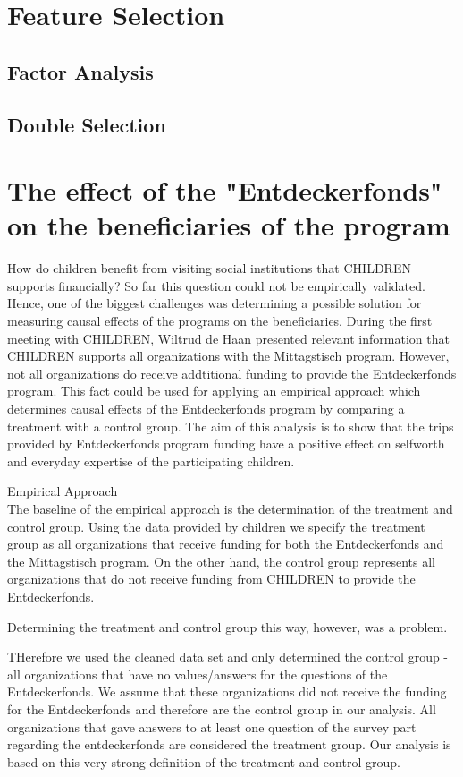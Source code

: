 \documentclass[12pt, a4paper, titlepage]{article}\usepackage[]{graphicx}\usepackage[]{color}
\begin{document}
\section{Feature Selection}

\subsection{Factor Analysis}

\subsection{Double Selection}

\section{The effect of the "Entdeckerfonds" on the beneficiaries of the program}

How do children benefit from visiting social institutions that CHILDREN supports financially? So far this question could not be empirically validated. Hence, one of the biggest challenges was determining a possible solution for measuring causal effects of the programs on the beneficiaries. During the first meeting with CHILDREN, Wiltrud de Haan presented relevant information that CHILDREN supports all organizations with the Mittagstisch program. However, not all organizations do receive addtitional funding to provide the Entdeckerfonds program. This fact could be used for applying an empirical approach which determines causal effects of the Entdeckerfonds program by comparing a treatment with a control group. The aim of this analysis is to show that the trips provided by Entdeckerfonds program funding have a positive effect on selfworth and everyday expertise of the participating children. 

Empirical Approach\\

The baseline of the empirical approach is the determination of the treatment and control group. Using the data provided by children we specify the treatment group as all organizations that receive funding for both the Entdeckerfonds and the Mittagstisch program. On the other hand, the control group represents all organizations that do not receive funding from CHILDREN to provide the Entdeckerfonds.

Determining the treatment and control group this way, however, was a problem.

THerefore we used the cleaned data set and only determined the control group - all organizations that have no values/answers for the questions of the Entdeckerfonds. We assume that these organizations did not receive the funding for the Entdeckerfonds and therefore are the control group in our analysis. All organizations that gave answers to at least one question of the survey part regarding the entdeckerfonds are considered the treatment group. 
Our analysis is based on this very strong definition of the treatment and control group.
\end{document}
